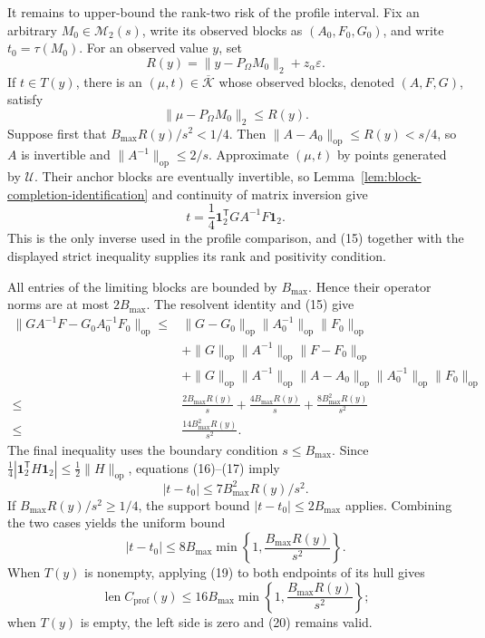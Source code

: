 It remains to upper-bound the rank-two risk of the profile interval.  Fix an arbitrary \(M_0\in\mathcal M_2(s)\), write its observed blocks as \((A_0,F_0,G_0)\), and write \(t_0=\tau(M_0)\).  For an observed value \(y\), set
\[
 R(y)=\lVert y-P_\Omega M_0\rVert_2+z_\alpha\varepsilon.
\tag{14}
\]
If \(t\in T(y)\), there is an \((\mu,t)\in\overline{\mathcal K}\) whose observed blocks, denoted \((A,F,G)\), satisfy
\[
 \lVert\mu-P_\Omega M_0\rVert_2\leq R(y).
\tag{15}
\]
Suppose first that \(B_{\max}R(y)/s^2<1/4\).  Then \(\lVert A-A_0\rVert_{\mathrm{op}}\leq R(y)<s/4\), so \(A\) is invertible and \(\lVert A^{-1}\rVert_{\mathrm{op}}\leq2/s\).  Approximate \((\mu,t)\) by points generated by \(\mathcal U\).  Their anchor blocks are eventually invertible, so Lemma~\ref{lem:block-completion-identification} and continuity of matrix inversion give
\[
 t=\frac14\mathbf1_2^{\mathsf T}GA^{-1}F\mathbf1_2.
\tag{16}
\]
This is the only inverse used in the profile comparison, and (15) together with the displayed strict inequality supplies its rank and positivity condition.

All entries of the limiting blocks are bounded by \(B_{\max}\).  Hence their operator norms are at most \(2B_{\max}\).  The resolvent identity and (15) give
\[
\begin{split}
 \lVert GA^{-1}F-G_0A_0^{-1}F_0\rVert_{\mathrm{op}}
 \leq{}&\lVert G-G_0\rVert_{\mathrm{op}}\lVert A_0^{-1}\rVert_{\mathrm{op}}\lVert F_0\rVert_{\mathrm{op}}\\
 &+\lVert G\rVert_{\mathrm{op}}\lVert A^{-1}\rVert_{\mathrm{op}}\lVert F-F_0\rVert_{\mathrm{op}}\\
 &+\lVert G\rVert_{\mathrm{op}}\lVert A^{-1}\rVert_{\mathrm{op}}
 \lVert A-A_0\rVert_{\mathrm{op}}\lVert A_0^{-1}\rVert_{\mathrm{op}}
 \lVert F_0\rVert_{\mathrm{op}}\\
 \leq{}&\frac{2B_{\max}R(y)}s+\frac{4B_{\max}R(y)}s
 +\frac{8B_{\max}^2R(y)}{s^2}\\
 \leq{}&\frac{14B_{\max}^2R(y)}{s^2}.
\end{split}
\tag{17}
\]
The final inequality uses the boundary condition \(s\leq B_{\max}\).  Since \(\tfrac14|\mathbf1_2^{\mathsf T}H\mathbf1_2|\leq\tfrac12\lVert H\rVert_{\mathrm{op}}\), equations (16)--(17) imply
\[
 |t-t_0|\leq7B_{\max}^2R(y)/s^2.
\tag{18}
\]
If \(B_{\max}R(y)/s^2\geq1/4\), the support bound \(|t-t_0|\leq2B_{\max}\) applies.  Combining the two cases yields the uniform bound
\[
 |t-t_0|\leq8B_{\max}
 \min\left\{1,\frac{B_{\max}R(y)}{s^2}\right\}.
\tag{19}
\]
When \(T(y)\) is nonempty, applying (19) to both endpoints of its hull gives
\[
 \operatorname{len}C_{\mathrm{prof}}(y)
 \leq16B_{\max}
 \min\left\{1,\frac{B_{\max}R(y)}{s^2}\right\};
\tag{20}
\]
when \(T(y)\) is empty, the left side is zero and (20) remains valid.

